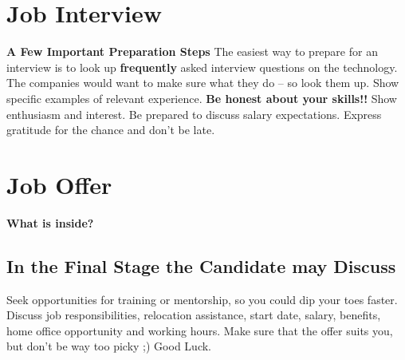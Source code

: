 \section{Job Interview}
\textbf{A Few Important Preparation Steps}
The easiest way to prepare for an interview is to look up \textbf{frequently} asked interview questions on the technology. The companies would want to make sure what they do -- so look them up. Show specific examples of relevant experience. \textbf{Be honest about your skills!!} Show enthusiasm and interest. Be prepared to discuss salary expectations. Express gratitude for the chance and don't be late.
\section{Job Offer}
\textbf{What is inside?}
\subsection{In the Final Stage the Candidate may Discuss}
Seek opportunities for training or mentorship, so you could dip your toes faster. Discuss job responsibilities, relocation assistance, start date, salary, benefits, home office opportunity and working hours. Make sure that the offer suits you, but don't be way too picky ;) 
Good Luck.
